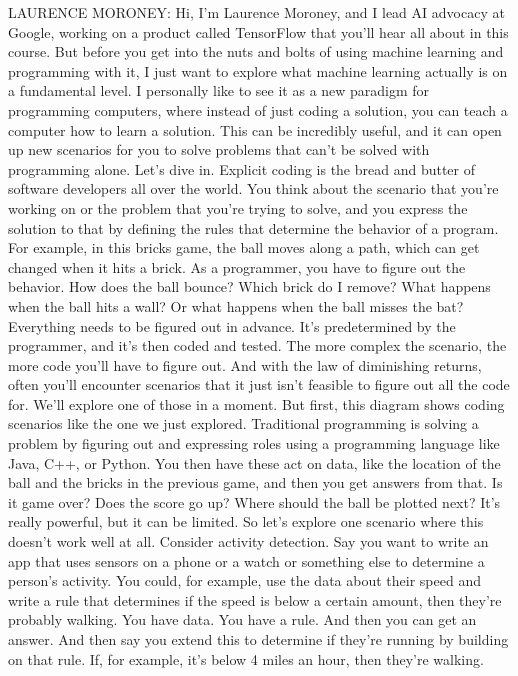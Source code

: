 LAURENCE MORONEY: Hi, I'm Laurence Moroney,
and I lead AI advocacy at Google, working
on a product called TensorFlow that you'll hear all about in this course.
But before you get into the nuts and bolts of using machine learning
and programming with it, I just want to explore what machine learning actually
is on a fundamental level.
I personally like to see it as a new paradigm for programming computers,
where instead of just coding a solution, you can teach
a computer how to learn a solution.
This can be incredibly useful, and it can open up new scenarios for you
to solve problems that can't be solved with programming alone.
Let's dive in.
Explicit coding is the bread and butter of software developers
all over the world.
You think about the scenario that you're working on
or the problem that you're trying to solve,
and you express the solution to that by defining the rules that
determine the behavior of a program.
For example, in this bricks game, the ball moves along a path, which can get
changed when it hits a brick.
As a programmer, you have to figure out the behavior.
How does the ball bounce?
Which brick do I remove?
What happens when the ball hits a wall?
Or what happens when the ball misses the bat?
Everything needs to be figured out in advance.
It's predetermined by the programmer, and it's then coded and tested.
The more complex the scenario, the more code you'll have to figure out.
And with the law of diminishing returns, often you'll
encounter scenarios that it just isn't feasible to figure out
all the code for.
We'll explore one of those in a moment.
But first, this diagram shows coding scenarios like the one
we just explored.
Traditional programming is solving a problem by figuring out and expressing
roles using a programming language like Java, C++, or Python.
You then have these act on data, like the location of the ball
and the bricks in the previous game, and then you get answers from that.
Is it game over?
Does the score go up?
Where should the ball be plotted next?
It's really powerful, but it can be limited.
So let's explore one scenario where this doesn't work well at all.
Consider activity detection.
Say you want to write an app that uses sensors
on a phone or a watch or something else to determine a person's activity.
You could, for example, use the data about their speed
and write a rule that determines if the speed is below a certain amount,
then they're probably walking.
You have data.
You have a rule.
And then you can get an answer.
And then say you extend this to determine if they're
running by building on that rule.
If, for example, it's below 4 miles an hour, then they're walking.
